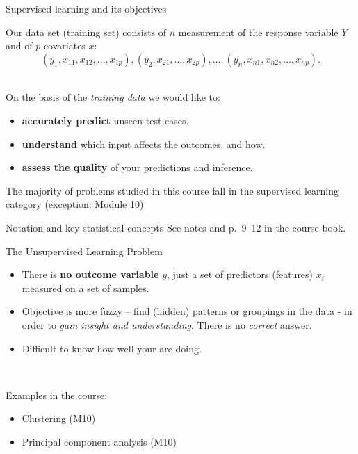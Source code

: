 \documentclass[
  ignorenonframetext,
]{beamer}
\providecommand{\tightlist}{%
  \setlength{\itemsep}{0pt}\setlength{\parskip}{0pt}}
\begin{document}
\begin{frame}
\begin{block}{Supervised learning and its objectives}
\protect\hypertarget{supervised-learning-and-its-objectives}{}
\vspace{2mm}

Our data set (training set) consists of \(n\) measurement of the
response variable \(Y\) and of \(p\) covariates \(x\):
\[(y_1, x_{11}, x_{12},\ldots, x_{1p}), (y_2, x_{21},\ldots, x_{2p}), \ldots, (y_n, x_{n1}, x_{n2},\ldots, x_{np}).\]
\(~\)

On the basis of the \emph{training data} we would like to:

\begin{itemize}
\item
  \textbf{accurately predict} unseen test cases.
\item
  \textbf{understand} which input affects the outcomes, and how.
\item
  \textbf{assess the quality} of your predictions and inference.
\end{itemize}

\vspace{2mm}

The majority of problems studied in this course fall in the supervised
learning category (exception: Module 10)
\end{block}
\end{frame}

\begin{frame}{Notation and key statistical concepts}
\protect\hypertarget{notation-and-key-statistical-concepts}{}
See notes and p.~9--12 in the course book.

\vspace{6cm}
\end{frame}

\begin{frame}{The Unsupervised Learning Problem}
\protect\hypertarget{the-unsupervised-learning-problem}{}
\begin{itemize}
\item
  There is \textbf{no outcome variable} \(y\), just a set of predictors
  (features) \(x_i\) measured on a set of samples.
\item
  Objective is more fuzzy -- find (hidden) patterns or groupings in the
  data - in order to \emph{gain insight and understanding}. There is no
  \emph{correct} answer.
\item
  Difficult to know how well your are doing.
\end{itemize}

\(~\)

Examples in the course:

\begin{itemize}
\tightlist
\item
  Clustering (M10)
\item
  Principal component analysis (M10)
\end{itemize}
\end{frame}
\end{document}

